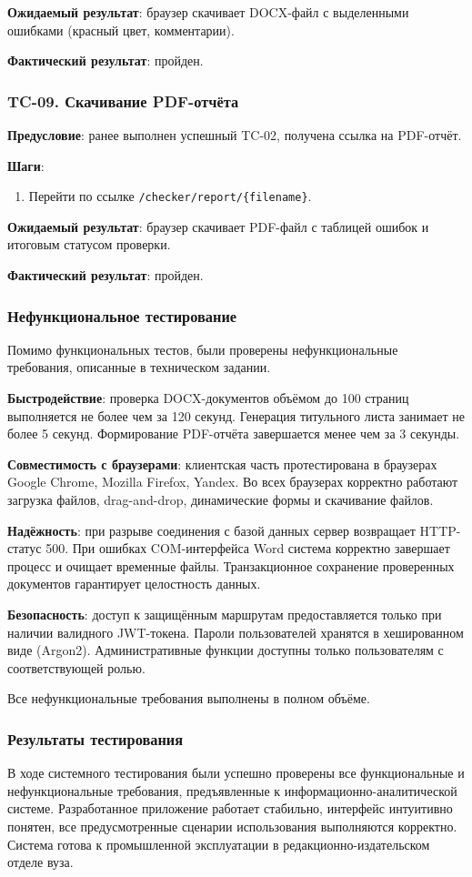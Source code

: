 \textbf{Ожидаемый результат}: браузер скачивает DOCX-файл с выделенными ошибками (красный цвет, комментарии).

\textbf{Фактический результат}: пройден.

\subsubsection{TC-09. Скачивание PDF-отчёта}

\textbf{Предусловие}: ранее выполнен успешный TC-02, получена ссылка на PDF-отчёт.

\textbf{Шаги}:
\begin{enumerate}
	\item Перейти по ссылке \texttt{/checker/report/\{filename\}}.
\end{enumerate}

\textbf{Ожидаемый результат}: браузер скачивает PDF-файл с таблицей ошибок и итоговым статусом проверки.

\textbf{Фактический результат}: пройден.

\subsubsection{Нефункциональное тестирование}

Помимо функциональных тестов, были проверены нефункциональные требования, описанные в техническом задании.

\textbf{Быстродействие}: проверка DOCX-документов объёмом до 100 страниц выполняется не более чем за 120 секунд. Генерация титульного листа занимает не более 5 секунд. Формирование PDF-отчёта завершается менее чем за 3 секунды.

\textbf{Совместимость с браузерами}: клиентская часть протестирована в браузерах Google Chrome, Mozilla Firefox, Yandex. Во всех браузерах корректно работают загрузка файлов, drag-and-drop, динамические формы и скачивание файлов.

\textbf{Надёжность}: при разрыве соединения с базой данных сервер возвращает HTTP-статус 500. При ошибках COM-интерфейса Word система корректно завершает процесс и очищает временные файлы. Транзакционное сохранение проверенных документов гарантирует целостность данных.

\textbf{Безопасность}: доступ к защищённым маршрутам предоставляется только при наличии валидного JWT-токена. Пароли пользователей хранятся в хешированном виде (Argon2). Административные функции доступны только пользователям с соответствующей ролью.

Все нефункциональные требования выполнены в полном объёме.

\subsubsection{Результаты тестирования}

В ходе системного тестирования были успешно проверены все функциональные и нефункциональные требования, предъявленные к информационно-аналитической системе. Разработанное приложение работает стабильно, интерфейс интуитивно понятен, все предусмотренные сценарии использования выполняются корректно. Система готова к промышленной эксплуатации в редакционно-издательском отделе вуза.